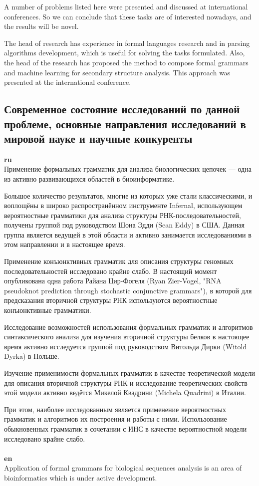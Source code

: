 \documentclass[12pt]{article}  %
\theoremstyle{remark}
\begin{document}
A number of problems listed here were presented and discussed at international conferences.
So we can conclude that these tasks are of interested nowadays, and the results will be novel.

The head of research has experience in formal languages research and in parsing algorithms development, which is useful for solving the tasks formulated.
Also, the head of the research has proposed the method to compose formal grammars and machine learning for secondary structure analysis. This approach was presented at the international conference.

\subsection{Современное состояние исследований по данной проблеме, основные направления исследований в мировой науке и научные конкуренты}

\textbf{ru}\\
Применение формальных грамматик для анализа биологических цепочек --- одна из активно развивающихся областей в биоинформатике.

Большое количество результатов, многие из которых уже стали классическими, и воплощёны в широко распространённом инструменте Infernal, использующем вероятностные грамматики для анализа структуры РНК-последовательностей, получены группой под руководством Шона Эдди (Sean Eddy) в США.
Данная группа является ведущей в этой области и активно занимается исследованиями в этом направлении и в настоящее время.

Применение конъюнктивных грамматик для описания структуры геномных последовательностей исследовано крайне слабо.
В настоящий момент опубликована одна работа Райана Цир-Фогеля (Ryan Zier-Vogel, "RNA pseudoknot prediction through stochastic conjunctive grammars"), в которой для предсказания вторичной структуры РНК используются вероятностные конъюнктивные грамматики.

Исследование возможностей использования формальных грамматик и алгоритмов синтаксического анализа для изучения вторичной структуры белков в настоящее время активно исследуется группой под руководством Витольда Дирки (Witold Dyrka) в Польше.

Изучение применимости формальных грамматик в качестве теоретической модели для описания вторичной структуры РНК и исследование теоретических свойств этой модели активно ведётся Микелой Квадрини (Michela Quadrini) в Италии.

При этом, наиболее исследованным является применение вероятностных грамматик и алгоритмов их построения и работы с ними.
Использование обыкновенных грамматик в сочетании с ИНС в качестве вероятностной модели исследовано крайне слабо.
\\
\\
\textbf{en}\\
Application of formal grammars for biological sequences analysis is an area of bioinformatics which is under active development.
\end{document}
